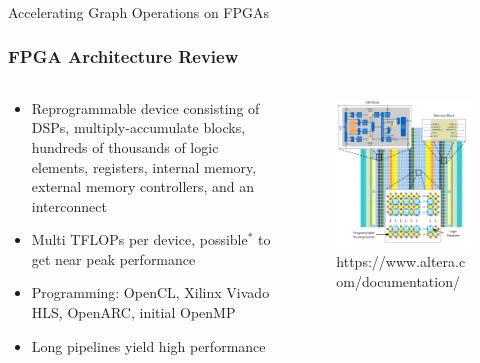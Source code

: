 \documentclass{beamer}
\begin{document}
\begin{frame}
  \frametitle{}
  \center \huge{Accelerating Graph Operations on FPGAs}
\end{frame}

\begin{frame}
  \frametitle{FPGA Architecture Review}
  \begin{columns}
    \begin{column}{0.5\textwidth}
      \begin{itemize}
        \item Reprogrammable device consisting of DSPs, multiply-accumulate blocks, hundreds of
          thousands of logic elements, registers, internal memory, external memory controllers, and an interconnect
        \item Multi TFLOPs per device, possible$^{*}$ to get near peak performance
        \item Programming: OpenCL, Xilinx Vivado HLS, OpenARC, initial OpenMP
        \item Long pipelines yield high performance
      \end{itemize}
    \end{column}
    \begin{column}{0.5\textwidth}
      \begin{figure}
        \centering
        \includegraphics[width=\textwidth]{figures/fpga.png}
        {\tiny https://www.altera.com/documentation/}
      \end{figure}  
    \end{column}
  \end{columns}
\end{frame}
\end{document}
